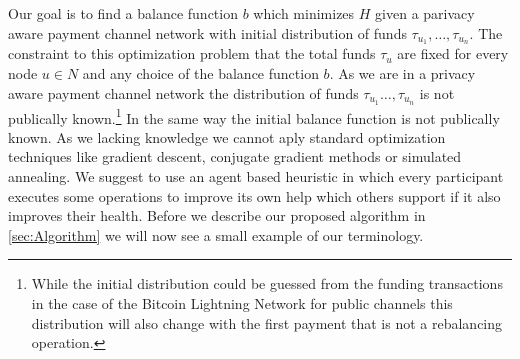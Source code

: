 \documentclass[a4paper]{paper}
\begin{document}
Our goal is to find a balance function $b$ which minimizes $H$ given a parivacy aware payment channel network with initial distribution of funds $\tau_{u_1},\dots,\tau_{u_n}$.
The constraint to this optimization problem that the total funds $\tau_u$ are fixed for every node $u \in N$ and any choice of the balance function $b$.
As we are in a privacy aware payment channel network the distribution of funds $\tau_{u_1}\dots,\tau_{u_n}$ is not publically known.\footnote{While the initial distribution could be guessed from the funding transactions in the case of the Bitcoin Lightning Network for public channels this distribution will also change with the first payment that is not a rebalancing operation.}
In the same way the initial balance function is not publically known.
As we lacking knowledge we cannot aply standard optimization techniques like gradient descent, conjugate gradient methods or simulated annealing.
We suggest to use an agent based heuristic in which every participant executes some operations to improve its own help which others support if it also improves their health.
Before we describe our proposed algorithm in \ref{sec:Algorithm} we will now see a small example of our terminology. 
\end{document}
